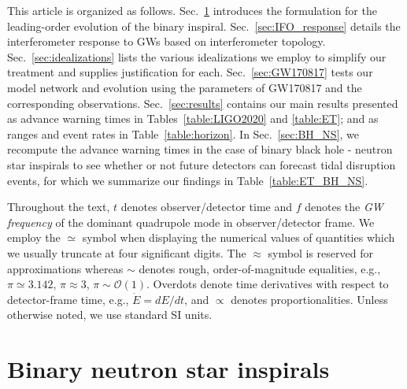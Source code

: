 \documentclass[prd,amsmath,amssymb,aps,floats,amsfonts,notitlepage,superscriptaddress,eqsecnum,nofootinbib,10pt]{revtex4-1}
\newcommand{\ord}{\mathcal{O}}
\begin{document}
%
This article is organized as follows. Sec.~\ref{sec:BNS_inspiral} introduces the formulation for the leading-order evolution of the binary inspiral.
Sec.~\ref{sec:IFO_response} details the interferometer response to GWs based on interferometer topology.
Sec.~\ref{sec:idealizations} lists the various idealizations we employ to simplify our treatment and supplies justification for each.
Sec.~\ref{sec:GW170817} tests our model network and evolution using the parameters of GW170817 and the corresponding observations.
Sec.~\ref{sec:results} contains our main results presented as advance warning times in Tables~\ref{table:LIGO2020} and \ref{table:ET}; 
and as ranges and event rates in Table~\ref{table:horizon}.
In Sec.~\ref{sec:BH_NS}, we recompute the advance warning times in the case of binary black hole - neutron star inspirals to see whether or not 
future detectors can forecast tidal disruption events, for which we summarize our findings in Table~\ref{table:ET_BH_NS}.

Throughout the text, $t$ denotes observer/detector time and $f$ denotes the \emph{GW frequency} of the dominant quadrupole mode in observer/detector frame. 
We employ the $\simeq$ symbol when displaying the numerical values of quantities %
which we usually truncate at four significant digits.
The $\approx$ symbol is reserved for approximations whereas $\sim$ denotes rough, order-of-magnitude equalities,
e.g., $\pi \simeq 3.142$, $\pi \approx 3$, $\pi \sim \ord(1)$. %
Overdots denote time derivatives with respect to detector-frame time, e.g., $\dot{E} =dE/dt$, and $\propto$ denotes proportionalities. 
Unless otherwise noted, we use standard SI units.

\section{Binary neutron star inspirals}\label{sec:BNS_inspiral}
\end{document}
